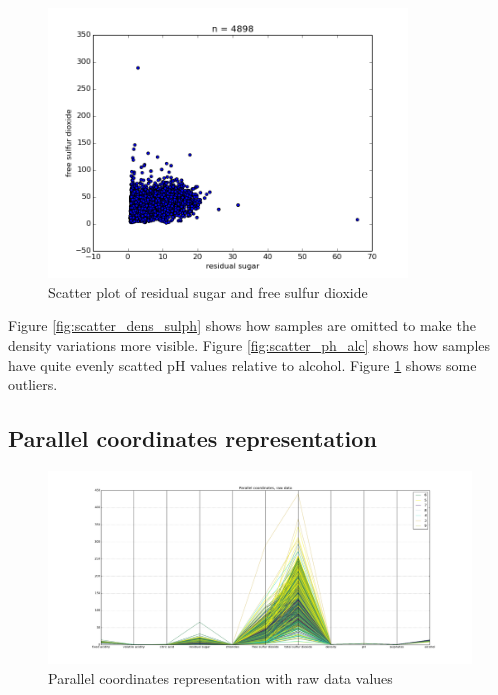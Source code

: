 \documentclass[12pt]{article}
\begin{document}
\begin{figure}[H]
    \centering
    \includegraphics[width=0.85\textwidth]{scatter_plot_residual_sugar_free_sulfur_dioxide}
    \caption{Scatter plot of residual sugar and free sulfur dioxide}
    \label{fig:scatter_rs_fsd}
\end{figure}

Figure \ref{fig:scatter_dens_sulph} shows how samples are omitted to make the density variations more visible. Figure \ref{fig:scatter_ph_alc} shows how samples have quite evenly scatted pH values relative to alcohol. Figure \ref{fig:scatter_rs_fsd} shows some outliers.

\subsection{Parallel coordinates representation}

\begin{figure}[H]
    \centering
    \includegraphics[width=1\textwidth]{parallel_raw}
    \caption{Parallel coordinates representation with raw data values}
    \label{fig:parallel_raw}
\end{figure}
\end{document}
